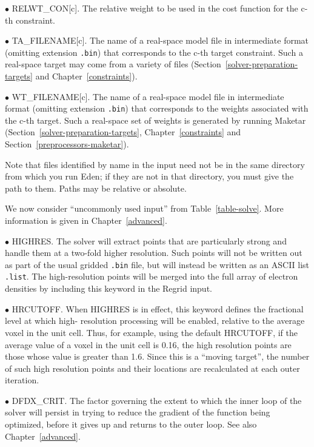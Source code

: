 \documentclass{report}
\begin{document}
$\bullet$ RELWT\_CON[c].
  The relative weight to be used in the cost
function for the c-th constraint. 

$\bullet$ TA\_FILENAME[c].
  The name of a real-space model file in intermediate
format (omitting extension {\tt .bin}) 
that corresponds to the c-th target constraint. 
Such a real-space target may come from a variety of files
(Section~\ref{solver-preparation-targets} and Chapter~\ref{constraints}).

$\bullet$ WT\_FILENAME[c].
  The name of a real-space model file in intermediate
format (omitting extension {\tt .bin}) 
that corresponds to the weights associated with the c-th target.
Such a real-space set of weights is generated by running Maketar
(Section~\ref{solver-preparation-targets}, Chapter~\ref{constraints} and
Section~\ref{preprocessors-maketar}).

\vspace {0.1in}

Note that files identified by name in the input need not be in the same 
directory from which you run Eden; if they are not in that directory,
you must give the path to them.  Paths may be relative or absolute.

\vspace {0.1in}

We now consider ``uncommonly used input'' from Table~\ref{table-solve}.
More information is given in Chapter~\ref{advanced}.

$\bullet$ HIGHRES. 
  The solver will extract points that are particularly strong and handle them
at a two-fold higher resolution.  Such points will not be written out as
part of the usual gridded {\tt .bin} file, but will instead be written as 
an ASCII list {\tt .list}.  The high-resolution points will be merged into
the full array of electron densities by including this keyword in the
Regrid input.

$\bullet$ HRCUTOFF.
 When HIGHRES is in effect, this keyword defines the fractional level at which 
high- resolution processing will be enabled, relative to the average voxel 
in the unit cell.  Thus, for example, using the default HRCUTOFF, if the
average value of a voxel in the unit cell is 0.16, the high resolution points
are those whose value is greater than 1.6.  Since this is a ``moving target'',
the number of such high resolution points and their locations are recalculated
at each outer iteration.

$\bullet$ DFDX\_CRIT.
  The factor governing the extent to which the inner loop of the 
solver will persist in trying to reduce the gradient of the function
being optimized, before it gives up and returns to the outer loop.
See also Chapter~\ref{advanced}.
\end{document}
